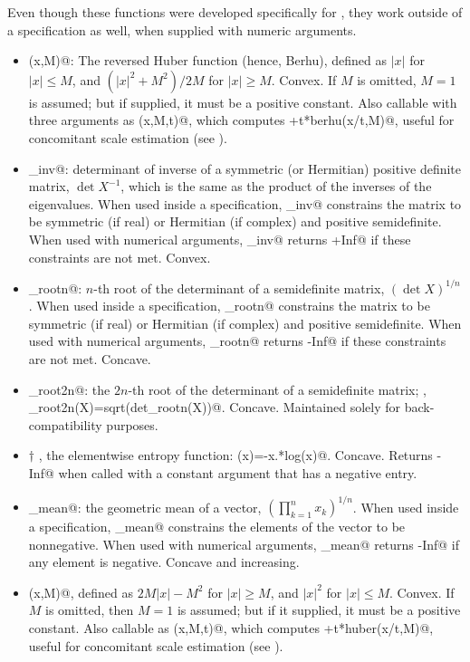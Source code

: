 \documentclass[12pt]{article}
\begin{document}
Even though these functions were developed specifically for \cvx, they work
outside of a \cvx specification as well, when supplied with numeric arguments.
\begin{itemize}
\item \verb@berhu(x,M)@: The reversed Huber function (hence, Berhu), defined as
$|x|$ for $|x|\leq M$, and $(|x|^2+M^2)/2M$ for $|x|\geq M$. Convex. If $M$
is omitted, $M=1$ is assumed; but if supplied, it must be a positive constant.
Also callable with three arguments 
as \verb@berhu(x,M,t)@, which computes \verb@t+t*berhu(x/t,M)@,
useful for concomitant scale estimation (see \cite{Owen}).

\item \verb@det_inv@: determinant of inverse of a symmetric (or Hermitian)
positive definite matrix, $\det X^{-1}$, which is the same as the
product of the inverses of the eigenvalues.
When used inside a \cvx specification, \verb@det_inv@ constrains
the matrix to be symmetric (if real) or Hermitian (if complex) and 
positive semidefinite. 
When used with numerical arguments, \verb@det_inv@ returns 
\verb@+Inf@ if these constraints are not met. Convex.

\item \verb@det_rootn@: $n$-th root of the determinant of a semidefinite matrix,
$(\det X)^{1/n}$. When used inside a \cvx specification, \verb@det_rootn@ constrains
the matrix to be symmetric (if real) or Hermitian (if complex) and positive semidefinite. 
When used with numerical arguments, \verb@det_rootn@ returns \verb@-Inf@ if these
constraints are not met. Concave.

\item \verb@det_root2n@: the $2n$-th root of the determinant of a semidefinite
matrix; \ie, \verb@det_root2n(X)=sqrt(det_rootn(X))@. Concave. Maintained
solely for back-compatibility purposes.
\item $\dagger$ \verb@entr@, the elementwise
entropy function: \verb@entr(x)=-x.*log(x)@. Concave.  Returns \verb@-Inf@ when
called with a constant argument that has a negative entry.

\item \verb@geo_mean@: the geometric mean of a vector, $\left( \prod_{k=1}^n x_k \right)^{1/n}$. When
used inside a \cvx specification, \verb@geo_mean@ constrains the elements of the vector
to be nonnegative. When used with numerical arguments, \verb@geo_mean@ returns \verb@-Inf@
if any element is negative.
Concave and increasing.

\item \verb@huber(x,M)@, defined as $2M|x|-M^2$ for $|x|\geq M$,
and $|x|^2$ for $|x|\leq M$. Convex. If $M$ is omitted, then $M=1$ is
assumed; but if it supplied, it must be a positive constant.
Also callable as \verb@huber(x,M,t)@, which computes \verb@t+t*huber(x/t,M)@,
useful for concomitant scale estimation
(see \cite{Owen}).


\end{itemize}
\end{document}
